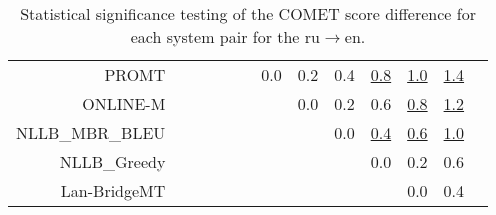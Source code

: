 \documentclass[11pt]{article}
\begin{document}
\begin{sidewaystable}
\begin{center}
{\begin{tabular}{rcccccccccccc}
PROMT &    &  &  &  &  & \cellcolor{red!0} 0.0 & \cellcolor{red!20} 0.2 & \cellcolor{red!30} 0.4 & \cellcolor{red!70} \underline{0.8} & \cellcolor{red!70} \underline{1.0} & \cellcolor{red!70} \underline{1.4}\\ 
ONLINE-M &    &  &  &  &  &  & \cellcolor{red!0} 0.0 & \cellcolor{red!0} 0.2 & \cellcolor{red!60} 0.6 & \cellcolor{red!70} \underline{0.8} & \cellcolor{red!70} \underline{1.2}\\ 
NLLB\_MBR\_BLEU &    &  &  &  &  &  &  & \cellcolor{red!0} 0.0 & \cellcolor{red!70} \underline{0.4} & \cellcolor{red!70} \underline{0.6} & \cellcolor{red!70} \underline{1.0}\\ 
NLLB\_Greedy &    &  &  &  &  &  &  &  & \cellcolor{red!0} 0.0 & \cellcolor{red!0} 0.2 & \cellcolor{red!40} 0.6\\ 
Lan-BridgeMT &  &    &  &  &  &  &  &  &  & \cellcolor{red!0} 0.0 & \cellcolor{red!0} 0.4\\ 
\bottomrule 
\end{tabular} }
\caption{Statistical significance testing of the COMET score difference for each system pair for the ru$\rightarrow$en.} 
 \end{center} \end{sidewaystable} 
\end{document}
